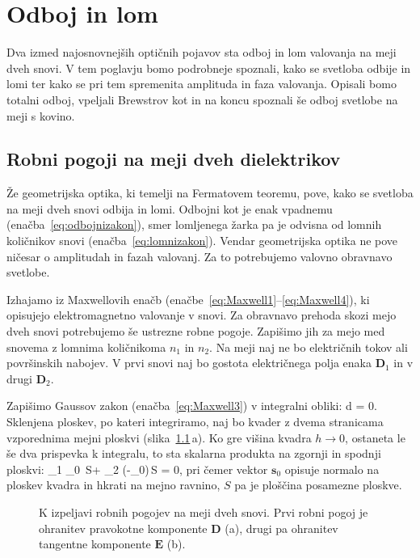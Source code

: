 
\chapter{Odboj in lom}
Dva izmed najosnovnejših optičnih pojavov sta odboj in lom valovanja na meji
dveh snovi. V tem poglavju bomo podrobneje spoznali, kako se svetloba odbije in lomi ter
kako se pri tem spremenita amplituda in faza valovanja. Opisali bomo totalni odboj,
vpeljali Brewstrov kot in na koncu spoznali še odboj svetlobe na meji s kovino.

\section{Robni pogoji na meji dveh dielektrikov}
Že geometrijska optika, ki temelji na Fermatovem teoremu, pove, kako se svetloba na 
meji dveh snovi odbija in lomi. Odbojni kot je enak vpadnemu (enačba~\ref{eq:odbojnizakon}), 
smer lomljenega žarka pa je odvisna od lomnih količnikov snovi (enačba~\ref{eq:lomnizakon}). 
Vendar geometrijska optika ne pove ničesar o amplitudah in fazah valovanj.
Za to potrebujemo valovno obravnavo svetlobe. 

Izhajamo iz Maxwellovih enačb (enačbe~\ref{eq:Maxwell1}--\ref{eq:Maxwell4}), ki 
opisujejo elektromagnetno valovanje v snovi. Za obravnavo prehoda
skozi mejo dveh snovi potrebujemo še ustrezne robne pogoje. Zapišimo jih
za mejo med snovema z lomnima količnikoma
$n_1$ in $n_2$. Na meji naj ne bo električnih tokov ali površinskih nabojev. 
V prvi snovi naj bo gostota električnega polja enaka $\mathbf{D}_1$ in v drugi 
$\mathbf{D}_2$.

Zapišimo Gaussov zakon (enačba~\ref{eq:Maxwell3}) v integralni obliki:
\beq
\oint {}\cdot d = 0.
\label{eq:04_01}
\eeq
Sklenjena ploskev, po kateri integriramo, naj bo kvader z dvema stranicama
vzporednima mejni ploskvi (slika~\ref{fig:04_RP}\,a). 
Ko gre višina kvadra $h \to 0$, ostaneta le še dva prispevka k integralu, to sta
skalarna produkta na zgornji
in spodnji ploskvi:
\beq
{}_1 \cdot {}_0\, S+ _2 \cdot (-_0)\,S = 0,
\label{eq:04_02}
\eeq
pri čemer vektor $\mathbf{s}_0 $ opisuje normalo na ploskev kvadra in hkrati na mejno ravnino, $S$ pa je 
ploščina posamezne ploskve.
\begin{figure}[!ht]
\centering
\def\svgwidth{130truemm} 

\caption{K izpeljavi robnih pogojev na meji dveh snovi. Prvi robni pogoj je ohranitev
pravokotne komponente $\mathbf{D}$ (a), drugi pa ohranitev tangentne komponente 
$\mathbf{E}$ (b).}
\label{fig:04_RP}
\end{figure}

